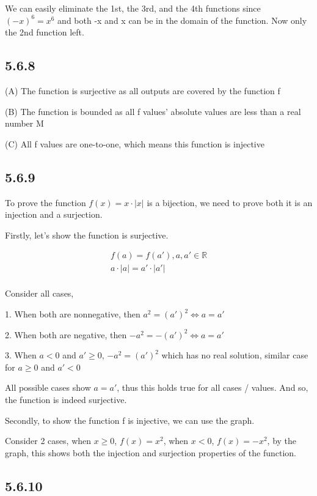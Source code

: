 \documentclass{article}
\begin{document}
We can easily eliminate the 1st, the 3rd, and the 4th functions since $(-x)^6=x^6$ and both -x and x can be in the domain of the function. Now only the 2nd function left.

\subsection*{5.6.8}

(A) The function is surjective as all outputs are covered by the function f

(B) The function is bounded as all f values' absolute values are less than a real number M

(C) All f values are one-to-one, which means this function is injective

\subsection*{5.6.9}

To prove the function $f(x)=x\cdot |x|$ is a bijection, we need to prove both it is an injection and a surjection.

Firstly, let's show the function is surjective.

\begin{gather*}
    f(a)=f(a'), a,a'\in\mathbb{R}\\
    a\cdot|a|=a'\cdot|a'|\\
\end{gather*}

Consider all cases,

1. When both are nonnegative, then $a^2=(a')^2\iff a=a'$

2. When both are negative, then $-a^2=-(a')^2\iff a=a'$

3. When $a<0$ and $a'\geq 0$, $-a^2=(a')^2$ which has no real solution, similar case for $a\geq 0$ and $a'<0$

All possible cases show $a=a'$, thus this holds true for all cases / values. And so, the function is indeed surjective. 

Secondly, to show the function f is injective, we can use the graph.

Consider 2 cases, when $x\geq 0$, $f(x)=x^2$, when $x<0$, $f(x)=-x^2$, by the graph, this shows both the injection and surjection properties of the function. 

\subsection*{5.6.10}
\end{document}
